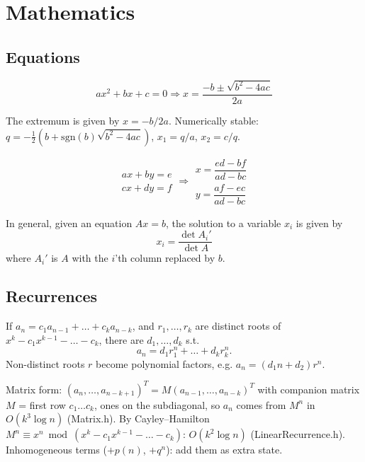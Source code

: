 
\chapter{Mathematics}

\section{Equations}
\[ax^2+bx+c=0 \Rightarrow x = \frac{-b\pm\sqrt{b^2-4ac}}{2a}\]

The extremum is given by $x = -b/2a$. Numerically stable: $q = -\frac12(b + \mathrm{sgn}(b)\sqrt{b^2-4ac})$, $x_1 = q/a$, $x_2 = c/q$.

\[\begin{aligned}ax+by=e\\cx+dy=f\end{aligned}
\Rightarrow
\begin{aligned}x=\dfrac{ed-bf}{ad-bc}\\y=\dfrac{af-ec}{ad-bc}\end{aligned}\]

In general, given an equation $Ax = b$, the solution to a variable $x_i$ is given by
\[x_i = \frac{\det A_i'}{\det A} \]
where $A_i'$ is $A$ with the $i$'th column replaced by $b$.

\section{Recurrences}
If $a_n = c_1 a_{n-1} + \dots + c_k a_{n-k}$, and $r_1, \dots, r_k$ are distinct roots of $x^k - c_1 x^{k-1} - \dots - c_k$, there are $d_1, \dots, d_k$ s.t.
\[a_n = d_1r_1^n + \dots + d_kr_k^n. \]
Non-distinct roots $r$ become polynomial factors, e.g. $a_n = (d_1n + d_2)r^n$.

Matrix form: $(a_n, \dots, a_{n-k+1})^T = M (a_{n-1}, \dots, a_{n-k})^T$ with
companion matrix $M$ = first row $c_1 \dots c_k$, ones on the subdiagonal, so
$a_n$ comes from $M^{n}$ in $O(k^3 \log n)$ (Matrix.h). By Cayley--Hamilton
$M^n \equiv x^n \bmod (x^k - c_1x^{k-1} - \dots - c_k)$: $O(k^2\log n)$ (LinearRecurrence.h).
Inhomogeneous terms ($+p(n)$, $+q^n$): add them as extra state.

